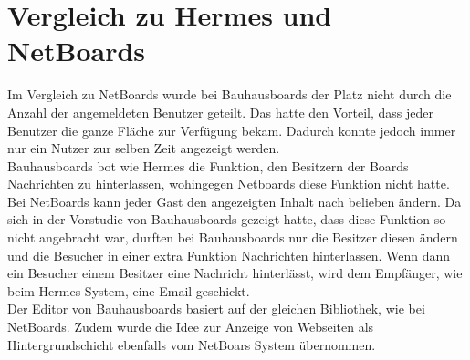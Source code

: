 


















\section{Vergleich zu Hermes und NetBoards}\label{Vergleich zu Hermes und Netboards}
Im Vergleich zu NetBoards wurde bei Bauhausboards der Platz nicht durch die Anzahl der angemeldeten Benutzer geteilt.
Das hatte den Vorteil, dass jeder Benutzer die ganze Fläche zur Verfügung bekam.
Dadurch konnte jedoch immer nur ein Nutzer zur selben Zeit angezeigt werden.
\\
Bauhausboards bot wie Hermes die Funktion, den Besitzern der Boards Nachrichten zu hinterlassen, wohingegen Netboards diese Funktion nicht hatte.
\\
Bei NetBoards kann jeder Gast den angezeigten Inhalt nach belieben ändern.
Da sich in der Vorstudie von Bauhausboards gezeigt hatte, dass diese Funktion so nicht angebracht war, durften bei Bauhausboards nur die Besitzer diesen ändern und die Besucher in einer extra Funktion Nachrichten hinterlassen.
Wenn dann ein Besucher einem Besitzer eine Nachricht hinterlässt, wird dem Empfänger, wie beim Hermes System, eine Email geschickt.
\\
Der Editor von Bauhausboards basiert auf der gleichen Bibliothek, wie bei NetBoards. Zudem wurde die Idee zur Anzeige von Webseiten als Hintergrundschicht ebenfalls vom NetBoars System übernommen.
\\
